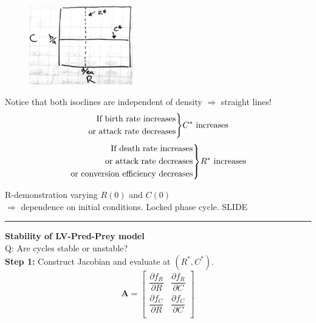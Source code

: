 \documentclass{article}
\newcommand{\note}[1]{\colorbox{gray!30}{#1}}
\newcommand{\ind}{\-\hspace{1cm}}
\newenvironment{rcases}
  {\left.\begin{aligned}}
  {\end{aligned}\right\rbrace}
\begin{document}
{
\begin{figure}
\includegraphics[width=4.5cm]{figs/LViso.pdf}
\end{figure}

Notice that both isoclines are independent of density $\Rightarrow$ straight lines!
\begin{equation*}
\begin{rcases}
  \text{If birth rate increases} & \\
  \text{or attack rate decreases} & \\
\end{rcases}
C^* \text{ increases}
\end{equation*}
\begin{equation*}
\begin{rcases}
  \text{If death rate increases} & \\
  \text{or attack rate decreases} & \\
    \text{or conversion efficiency decreases} & \\
\end{rcases}
R^* \text{ increases}
\end{equation*}

}
\ind \note{R-demonstration varying $R(0)$ and $C(0)$} \\
\ind \ind $\Rightarrow$ dependence on initial conditions. Locked phase cycle. \note{SLIDE}


\rule[0.5ex]{\linewidth}{1pt}

\pagebreak
\textbf{Stability of LV-Pred-Prey model}\\
Q: Are cycles stable or unstable?\\
\textbf{Step 1:} Construct Jacobian and evaluate at $(R^*,C^*)$.\\
\begin{equation*}
	\mathbf{A}=
	\begin{bmatrix}
		\dfrac{\partial f_R}{\partial R} & \dfrac{\partial f_R}{\partial C}\\[1em]
		\dfrac{\partial f_C}{\partial R} & \dfrac{\partial f_C}{\partial C}\\
	\end{bmatrix}
\end{equation*}
\end{document}

